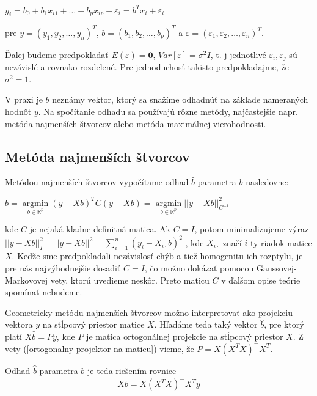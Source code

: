 \begin{center}
$
y_i = b_0 + b_1 x_{i1} + … + b_p x_{ip} + {\varepsilon}_i = b^T x_i + {\varepsilon}_i
$
\end{center}

pre $y = (y_1, y_2, \ldots, y_n)^T$, $b = (b_1, b_2, \ldots, b_p)^T$ a $\varepsilon = ({\varepsilon}_1, {\varepsilon}_2, \ldots, {\varepsilon}_n)^T$.

Ďalej budeme predpokladať $E(\varepsilon) = \textbf{0}$, $Var[\varepsilon] = {\sigma}^2 I$,
t. j jednotlivé ${\varepsilon}_i, {\varepsilon}_j$ sú nezávislé a rovnako rozdelené.
Pre jednoduchosť takisto predpokladajme, že ${\sigma}^2 = 1$.

V praxi je $b$ neznámy vektor, ktorý sa snažíme odhadnúť na základe nameraných hodnôt $y$.
Na spočítanie odhadu sa používajú rôzne metódy, najčastejšie napr. metóda najmenších štvorcov alebo metóda maximálnej vierohodnosti.

\subsection{Metóda najmenších štvorcov}

Metódou najmenších štvorcov vypočítame odhad $\hat{b}$ parametra $b$ nasledovne:

\begin{center}
$
\hat{b} = \underset{b \in \mathbb{R}^{p}}{\operatorname{arg min}} (y - Xb)^T C (y - Xb) =
\underset{b \in \mathbb{R}^{p}}{\operatorname{arg min}} ||y - Xb||_{C^{-1}}^2
$
\end{center}

kde $C$ je nejaká kladne definitná matica. 
Ak $C = I$, potom minimalizujeme výraz
$||y - Xb||_I^2 = ||y - Xb||^2 = \sum_{i=1}^n (y_i - X_{i \cdot } b)^2$
, kde $X_{i \cdot }$ značí $i$-ty riadok matice $X$.
Keďže sme predpokladali nezávislosť chýb a tiež homogenitu ich rozptylu, je pre nás najvýhodnejšie dosadiť $C = I$,
čo možno dokázať pomocou Gaussovej-Markovovej vety, ktorú uvedieme neskôr.
Preto maticu $C$ v ďalšom opise teórie spomínať nebudeme.

Geometricky metódu najmenších štvorcov možno interpretovať ako projekciu vektora $y$ 
na stĺpcový priestor matice $X$. Hľadáme teda taký vektor $\hat{b}$, 
pre ktorý platí $X \hat{b} = Py$, kde $P$ je matica ortogonálnej projekcie na stĺpcový priestor $X$. 
Z vety (\ref{ortogonalny projektor na maticu}) vieme, že $P = X (X^T X)^- X^T$.

Odhad $\hat{b}$ parametra $b$ je teda riešením rovnice
\begin{align}
\label{least squares solution}
X b =  X (X^T X)^- X^T y
\end{align}

